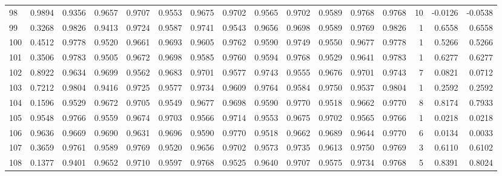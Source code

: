 \begin{tabular}{lrrrrrrrrrrrrrrr}
98  &      0.9894 &  0.9356 &  0.9657 &  0.9707 &  0.9553 &  0.9675 &  0.9702 &  0.9565 &  0.9702 &  0.9589 &   0.9768 &     0.9768 &     10 &                   -0.0126 &                    -0.0538 \\
99  &      0.3268 &  0.9826 &  0.9413 &  0.9724 &  0.9587 &  0.9741 &  0.9543 &  0.9656 &  0.9698 &  0.9589 &   0.9769 &     0.9826 &      1 &                    0.6558 &                     0.6558 \\
100 &      0.4512 &  0.9778 &  0.9520 &  0.9661 &  0.9693 &  0.9605 &  0.9762 &  0.9590 &  0.9749 &  0.9550 &   0.9677 &     0.9778 &      1 &                    0.5266 &                     0.5266 \\
101 &      0.3506 &  0.9783 &  0.9505 &  0.9672 &  0.9698 &  0.9585 &  0.9760 &  0.9594 &  0.9768 &  0.9529 &   0.9641 &     0.9783 &      1 &                    0.6277 &                     0.6277 \\
102 &      0.8922 &  0.9634 &  0.9699 &  0.9562 &  0.9683 &  0.9701 &  0.9577 &  0.9743 &  0.9555 &  0.9676 &   0.9701 &     0.9743 &      7 &                    0.0821 &                     0.0712 \\
103 &      0.7212 &  0.9804 &  0.9416 &  0.9725 &  0.9577 &  0.9734 &  0.9609 &  0.9764 &  0.9584 &  0.9750 &   0.9537 &     0.9804 &      1 &                    0.2592 &                     0.2592 \\
104 &      0.1596 &  0.9529 &  0.9672 &  0.9705 &  0.9549 &  0.9677 &  0.9698 &  0.9590 &  0.9770 &  0.9518 &   0.9662 &     0.9770 &      8 &                    0.8174 &                     0.7933 \\
105 &      0.9548 &  0.9766 &  0.9559 &  0.9674 &  0.9703 &  0.9566 &  0.9714 &  0.9553 &  0.9675 &  0.9702 &   0.9565 &     0.9766 &      1 &                    0.0218 &                     0.0218 \\
106 &      0.9636 &  0.9669 &  0.9690 &  0.9631 &  0.9696 &  0.9590 &  0.9770 &  0.9518 &  0.9662 &  0.9689 &   0.9644 &     0.9770 &      6 &                    0.0134 &                     0.0033 \\
107 &      0.3659 &  0.9761 &  0.9589 &  0.9769 &  0.9520 &  0.9656 &  0.9702 &  0.9573 &  0.9735 &  0.9613 &   0.9750 &     0.9769 &      3 &                    0.6110 &                     0.6102 \\
108 &      0.1377 &  0.9401 &  0.9652 &  0.9710 &  0.9597 &  0.9768 &  0.9525 &  0.9640 &  0.9707 &  0.9575 &   0.9734 &     0.9768 &      5 &                    0.8391 &                     0.8024 \\

\end{tabular}

